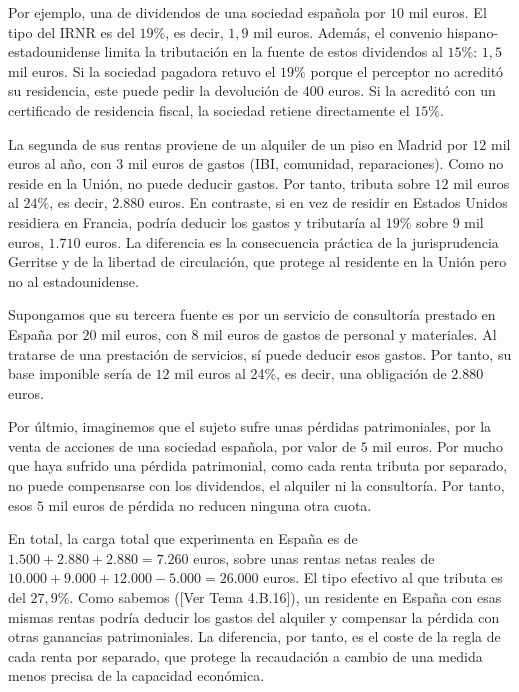 \documentclass[10pt,a4paper]{article}
\newcommand{\authorfont}[1]{{\fontfamily{EBGaramond-TLF}\selectfont #1}}
\begin{document}
Por ejemplo, una de dividendos de una sociedad española por $10$ mil euros. El tipo del IRNR es del $19\%$, es decir, $1,9$ mil euros. Además, el convenio hispano-estadounidense limita la tributación en la fuente de estos dividendos al $15\%$: $1,5$ mil euros.
Si la sociedad pagadora retuvo el $19\%$ porque el perceptor no acreditó su residencia, este puede pedir la devolución de $400$ euros. Si la acreditó con un certificado de residencia fiscal, la sociedad retiene directamente el $15\%$.

La segunda de sus rentas proviene de un alquiler de un piso en Madrid por $12$ mil euros al año, con $3$ mil euros de gastos (IBI, comunidad, reparaciones). Como no reside en la Unión, no puede deducir gastos. Por tanto, tributa sobre $12$ mil euros al $24\%$, es decir, $2{.}880$ euros. En contraste, si en vez de residir en Estados Unidos residiera en Francia, podría deducir los gastos y tributaría al $19\%$ sobre $9$ mil euros, $1{.}710$ euros. La diferencia es la consecuencia práctica de la jurisprudencia Gerritse y de la libertad de circulación, que protege al residente en la Unión pero no al estadounidense.

Supongamos que su tercera fuente es por un servicio de consultoría prestado en España por $20$ mil euros, con $8$ mil euros de gastos de personal y materiales. Al tratarse de una prestación de servicios, sí puede deducir esos gastos. Por tanto, su base imponible sería de $12$ mil euros al 24\%, es decir, una obligación de $2{.}880$ euros.

Por últmio, imaginemos que el sujeto sufre unas pérdidas patrimoniales, por la venta de acciones de una sociedad española, por valor de $5$ mil euros. Por mucho que haya sufrido una pérdida patrimonial, como cada renta tributa por separado, no puede compensarse con los dividendos, el alquiler ni la consultoría. Por tanto, esos $5$ mil euros de pérdida no reducen ninguna otra cuota.

En total, la carga total que experimenta en España es de $1.500 + 2.880 + 2.880 = 7.260$ euros, sobre unas rentas netas reales de $10.000 + 9.000 + 12.000 - 5.000 = 26.000$ euros. El tipo efectivo al que tributa es del $27,9\%$. Como sabemos ([\authorfont{Ver Tema 4.B.16}]), un residente en España con esas mismas rentas podría deducir los gastos del alquiler y compensar la pérdida con otras ganancias patrimoniales. La diferencia, por tanto, es el coste de la regla de cada renta por separado, que protege la recaudación a cambio de una medida menos precisa de la capacidad económica.
\end{document}
